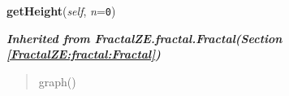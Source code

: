    \vspace{0.5ex}

\hspace{.8\funcindent}\begin{boxedminipage}{\funcwidth}

    \raggedright \textbf{getHeight}(\textit{self}, \textit{n}={\tt 0})

\setlength{\parskip}{2ex}
\setlength{\parskip}{1ex}
    \end{boxedminipage}


\large{\textbf{\textit{Inherited from FractalZE.fractal.Fractal\textit{(Section \ref{FractalZE:fractal:Fractal})}}}}

\begin{quote}
graph()
\end{quote}
